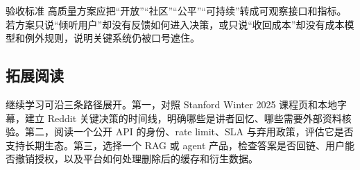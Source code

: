 \begin{knowledgebox}{验收标准}
高质量方案应把“开放”“社区”“公平”“可持续”转成可观察接口和指标。若方案只说“倾听用户”却没有反馈如何进入决策，或只说“收回成本”却没有成本模型和例外规则，说明关键系统仍被口号遮住。
\end{knowledgebox}

\subsection{拓展阅读}

继续学习可沿三条路径展开。第一，对照 Stanford Winter 2025 课程页和本地字幕，建立 Reddit 关键决策的时间线，明确哪些是讲者回忆、哪些需要外部资料核验。第二，阅读一个公开 API 的身份、rate limit、SLA 与弃用政策，评估它是否支持长期生态。第三，选择一个 RAG 或 agent 产品，检查答案是否回链、用户能否撤销授权，以及平台如何处理删除后的缓存和衍生数据。

